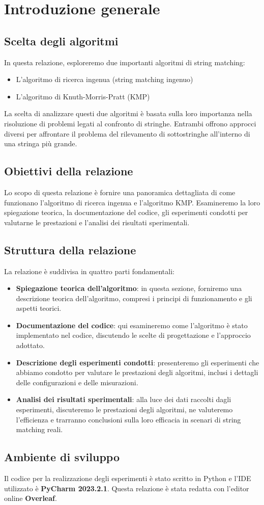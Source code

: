 \section{Introduzione generale}

\subsection{Scelta degli algoritmi}
In questa relazione, esploreremo due importanti algoritmi di string matching: 
\begin{itemize}
    \item L'algoritmo di ricerca ingenua (string matching ingenuo)
    \item L'algoritmo di Knuth-Morris-Pratt (KMP)
\end{itemize}
La scelta di analizzare questi due algoritmi è basata sulla loro importanza nella risoluzione di problemi legati al confronto di stringhe. Entrambi offrono approcci diversi per affrontare il problema del rilevamento di sottostringhe all'interno di una stringa più grande.

\subsection{Obiettivi della relazione}
Lo scopo di questa relazione è fornire una panoramica dettagliata di come funzionano l'algoritmo di ricerca ingenua e l'algoritmo KMP. Esamineremo la loro spiegazione teorica, la documentazione del codice, gli esperimenti condotti per valutarne le prestazioni e l'analisi dei risultati sperimentali. 

\subsection{Struttura della relazione}
La relazione è suddivisa in quattro parti fondamentali:

\begin{itemize}
    \item \textbf{Spiegazione teorica dell'algoritmo}: in questa sezione, forniremo una descrizione teorica dell'algoritmo, compresi i principi di funzionamento e gli aspetti teorici.
    \item \textbf{Documentazione del codice}: qui esamineremo come l'algoritmo è stato implementato nel codice, discutendo le scelte di progettazione e l'approccio adottato.
    \item \textbf{Descrizione degli esperimenti condotti}: presenteremo gli esperimenti che abbiamo condotto per valutare le prestazioni degli algoritmi, inclusi i dettagli delle configurazioni e delle misurazioni.
    \item \textbf{Analisi dei risultati sperimentali}: alla luce dei dati raccolti dagli esperimenti, discuteremo le prestazioni degli algoritmi, ne valuteremo l'efficienza e trarranno conclusioni sulla loro efficacia in scenari di string matching reali.
\end{itemize}

\subsection{Ambiente di sviluppo}
Il codice per la realizzazione degli esperimenti è stato scritto in Python e l'IDE utilizzato è \textbf{PyCharm 2023.2.1}. Questa relazione è stata redatta con l'editor online \textbf{Overleaf}.
